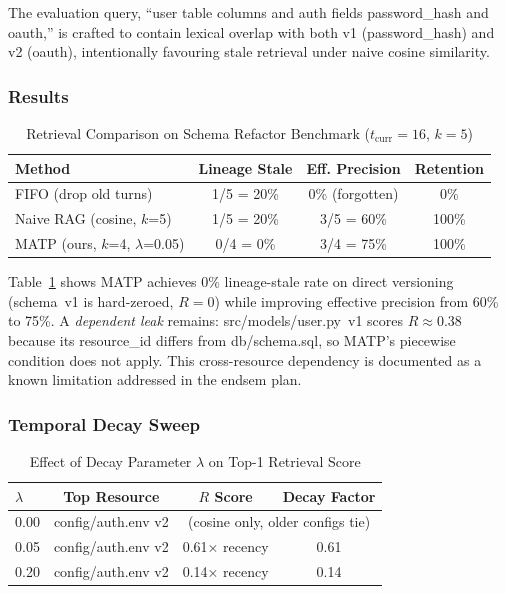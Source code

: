 \documentclass[lettersize,journal]{IEEEtran}
\begin{document}
The evaluation query, ``user table columns and auth fields password\_hash and oauth,'' is crafted to contain lexical overlap with both v1 (password\_hash) and v2 (oauth), intentionally favouring stale retrieval under naive cosine similarity.

\subsubsection{Results}

\begin{table}[!t]
\caption{Retrieval Comparison on Schema Refactor Benchmark ($t_{\text{curr}} = 16$, $k = 5$)\label{tab:retrieval}}
\centering
\begin{tabular}{lccc}
\toprule
\textbf{Method} & \textbf{Lineage Stale} & \textbf{Eff. Precision} & \textbf{Retention} \\
\midrule
FIFO (drop old turns) & 1/5 = 20\% & 0\% (forgotten) & 0\% \\
Naive RAG (cosine, $k$=5) & 1/5 = 20\% & 3/5 = 60\% & 100\% \\
MATP (ours, $k$=4, $\lambda$=0.05) & 0/4 = 0\% & 3/4 = 75\% & 100\% \\
\bottomrule
\end{tabular}
\end{table}

Table~\ref{tab:retrieval} shows MATP achieves 0\% lineage-stale rate on direct versioning (schema~v1 is hard-zeroed, $R = 0$) while improving effective precision from 60\% to 75\%. A \emph{dependent leak} remains: src/models/user.py~v1 scores $R \approx 0.38$ because its resource\_id differs from db/schema.sql, so MATP's piecewise condition does not apply. This cross-resource dependency is documented as a known limitation addressed in the endsem plan.

\subsubsection{Temporal Decay Sweep}

\begin{table}[!t]
\caption{Effect of Decay Parameter $\lambda$ on Top-1 Retrieval Score\label{tab:decay}}
\centering
\begin{tabular}{lccc}
\toprule
$\lambda$ & Top Resource & $R$ Score & Decay Factor \\
\midrule
0.00 & config/auth.env v2 & \multicolumn{2}{c}{(cosine only, older configs tie)} \\
0.05 & config/auth.env v2 & 0.61× recency & 0.61 \\
0.20 & config/auth.env v2 & 0.14× recency & 0.14 \\
\bottomrule
\end{tabular}
\end{table}
\end{document}
